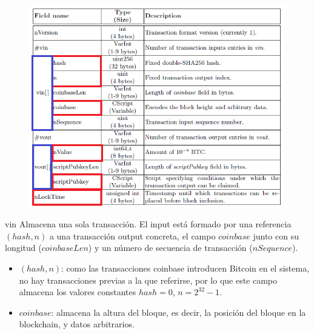 \documentclass{beamer}
\theoremstyle{definition}
\begin{document}
\begin{frame}

	\begin{figure}
		\includegraphics[scale=0.5]{coinbase}
	\end{figure}
\end{frame}

\begin{frame}
	\begin{block}{vin}
		Almacena una sola transacción. El input está formado por una referencia $(hash, n)$ a una transacción output concreta, el campo $coinbase$ junto con su longitud ($coinbaseLen$) y un número de secuencia de transacción ($nSequence$).
	\end{block}
\end{frame}

\begin{frame}
	\begin{itemize}
		\item<1-> $(hash,n)$: como las transacciones coinbase introducen Bitcoin en el sistema, no hay transacciones previas a la que referirse, por lo que este campo almacena los valores constantes $hash=0$, $n=2^{32}-1$. 
		\item<2-> $coinbase$: almacena la altura del bloque, es decir, la posición del bloque en la blockchain, y datos arbitrarios. 
	\end{itemize}

\end{frame}
\end{document}
